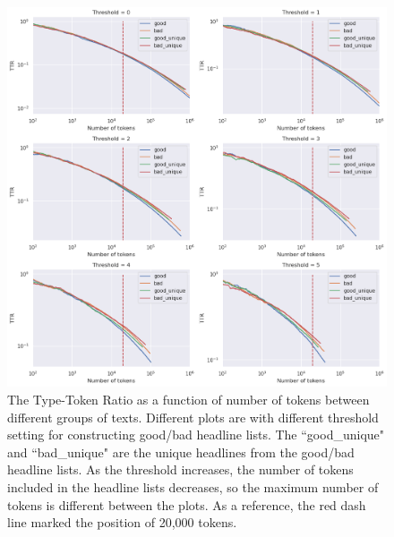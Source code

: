 \documentclass[%
preprint,
 amsmath,amssymb,
 aps,
]{revtex4-2}
\begin{document}
\begin{figure}
    \centering
    \includegraphics[width=\linewidth]{fig/ttr2_TTR_with_threshold.png}
    \caption{The Type-Token Ratio as a function of number of tokens between different groups of texts. Different plots are with different threshold setting for constructing good/bad headline lists. The ``good\_unique" and ``bad\_unique" are the unique headlines from the good/bad headline lists. As the threshold increases, the number of tokens included in the headline lists decreases, so the maximum number of tokens is different between the plots. As a reference, the red dash line marked the position of 20,000 tokens.}
    \label{fig:ttr2_TTR}
\end{figure}
\end{document}
